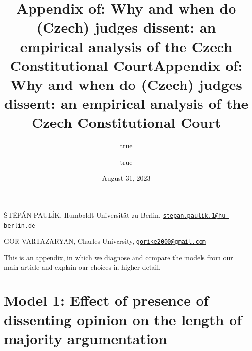 \documentclass[
  11pt,
]{article}
\title{Appendix of: Why and when do (Czech) judges dissent: an empirical
analysis of the Czech Constitutional Court}
\author{true \and true}
\date{August 31, 2023}
\title{Appendix of: Why and when do (Czech) judges dissent: an empirical
analysis of the Czech Constitutional Court }
\date{}
\begin{document}



{%
\setlength{\parindent}{0pt}
\thispagestyle{plain}
{%
\maketitle  %

}




{
   \vskip 13.5pt\relax \normalsize\fontsize{11}{12}
   \MakeUppercase{Štěpán Paulík}, \small{Humboldt Universität zu Berlin,
\href{mailto:stepan.paulik.1@hu-berlin.de}{\nolinkurl{stepan.paulik.1@hu-berlin.de}}}   \par \vskip -3.5pt \MakeUppercase{Gor
Vartazaryan}, \small{Charles University,
\href{mailto:gorike2000@gmail.com}{\nolinkurl{gorike2000@gmail.com}}}   

}

}






\vskip -8.5pt

{
\hypersetup{linkcolor=black}
\setcounter{tocdepth}{2}
\tableofcontents
}


{
\setcounter{tocdepth}{2}
\tableofcontents
}

\setlength{\parindent}{16pt}
\setlength{\parskip}{0pt}

\doublespacing
\vspace{30pt}

This is an appendix, in which we diagnose and compare the models from
our main article and explain our choices in higher detail.

\hypertarget{model-1-effect-of-presence-of-dissenting-opinion-on-the-length-of-majority-argumentation}{%
\section{Model 1: Effect of presence of dissenting opinion on the length
of majority
argumentation}\label{model-1-effect-of-presence-of-dissenting-opinion-on-the-length-of-majority-argumentation}}
\end{document}
